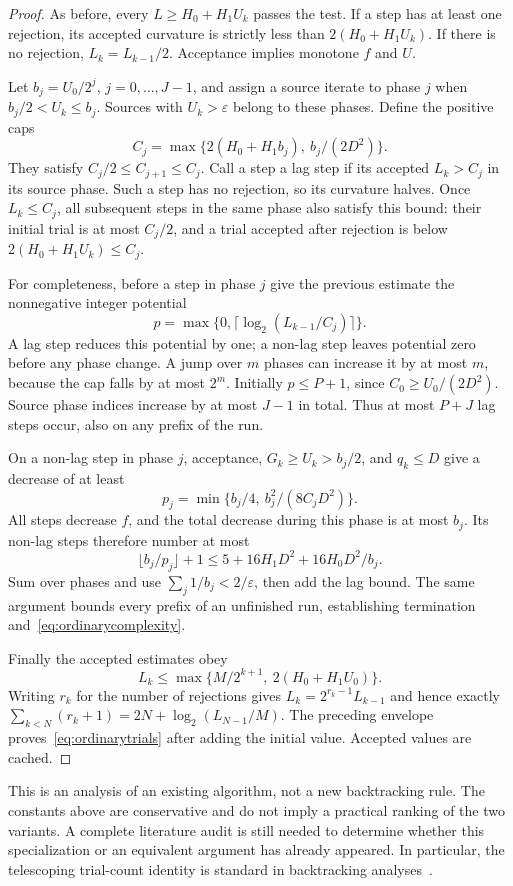\begin{proof}
As before, every $L\ge H_0+H_1U_k$ passes the test. If a step has at
least one rejection, its accepted curvature is strictly less than
$2(H_0+H_1U_k)$. If there is no rejection, $L_k=L_{k-1}/2$.
Acceptance implies monotone $f$ and $U$.

Let $b_j=U_0/2^j$, $j=0,\ldots,J-1$, and assign a source iterate to
phase $j$ when $b_j/2<U_k\le b_j$. Sources with $U_k>\varepsilon$
belong to these phases. Define the positive caps
\[
 C_j=\max\{2(H_0+H_1b_j),\ b_j/(2D^2)\}.
\]
They satisfy $C_j/2\le C_{j+1}\le C_j$.
Call a step a lag step if its accepted $L_k>C_j$ in its source phase.
Such a step has no rejection, so its curvature halves. Once
$L_k\le C_j$, all subsequent steps in the same phase also satisfy
this bound: their initial trial is at most $C_j/2$, and a trial
accepted after rejection is below $2(H_0+H_1U_k)\le C_j$.

For completeness, before a step in phase $j$ give the previous estimate
the nonnegative integer potential
\[
 p=\max\{0,\lceil\log_2(L_{k-1}/C_j)\rceil\}.
\]
A lag step reduces this potential by one; a non-lag step leaves
potential zero before any phase change. A jump over $m$ phases can
increase it by at most $m$, because the cap falls by at most $2^m$.
Initially $p\le P+1$, since $C_0\ge U_0/(2D^2)$. Source phase indices
increase by at most $J-1$ in total. Thus at most $P+J$ lag steps occur,
also on any prefix of the run.

On a non-lag step in phase $j$, acceptance, $G_k\ge U_k>b_j/2$,
and $q_k\le D$ give a decrease of at least
\[
 p_j=\min\{b_j/4,\ b_j^2/(8C_jD^2)\}.
\]
All steps decrease $f$, and the total decrease during this phase
is at most $b_j$. Its non-lag steps therefore number at most
\[
 \lfloor b_j/p_j\rfloor+1
 \le 5+16H_1D^2+16H_0D^2/b_j.
\]
Sum over phases and use $\sum_j1/b_j<2/\varepsilon$, then add the
lag bound. The same argument bounds every prefix of an unfinished
run, establishing termination and~\eqref{eq:ordinarycomplexity}.

Finally the accepted estimates obey
\[
 L_k\le\max\{M/2^{k+1},\ 2(H_0+H_1U_0)\}.
\]
Writing $r_k$ for the number of rejections gives
$L_k=2^{r_k-1}L_{k-1}$ and hence exactly
$\sum_{k<N}(r_k+1)=2N+\log_2(L_{N-1}/M)$.
The preceding envelope proves~\eqref{eq:ordinarytrials} after adding
the initial value. Accepted values are cached.
\end{proof}
This is an analysis of an existing algorithm, not a new backtracking
rule. The constants above are conservative and do not imply a practical
ranking of the two variants. A complete literature audit is still needed
to determine whether this specialization or an equivalent argument has
already appeared. In particular, the telescoping trial-count identity
is standard in backtracking analyses~\cite{pedregosa}.

